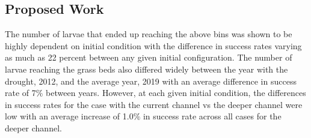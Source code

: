 \documentclass[american]{article}
\begin{document}
\begin{multicols}{3}
\section*{Proposed Work}
\noindent The number of larvae that ended up reaching the above bins was shown to be highly dependent on initial condition with the difference in success rates varying as much as 22 percent between any given initial configuration. The number of larvae reaching the grass beds also differed widely between the year with the drought, 2012, and the average year, 2019 with an average difference in success rate of 7$\%$ between years. However, at each given initial condition, the differences in success rates for the case with the current channel vs the deeper channel were low with an average increase of 1.0$\%$ in success rate across all cases for the deeper channel.


\renewcommand{\bibfont}{\fontsize{20}{20}\selectfont}
\nocite{*}
\printbibliography



\end{multicols}
\end{document}
